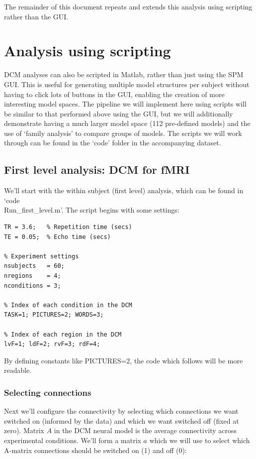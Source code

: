 \documentclass{article}
\begin{document}
The remainder of this document repeats and extends this analysis using scripting rather than the GUI.

\section{Analysis using scripting}

DCM analyses can also be scripted in Matlab, rather than just using the SPM GUI. This is useful for generating multiple model structures per subject without having to click lots of buttons in the GUI, enabling the creation of more interesting model spaces. The pipeline we will implement here using scripts will be similar to that performed above using the GUI, but we will additionally demonstrate having a much larger model space (112 pre-defined models) and the use of `family analysis' to compare groups of models. The scripts we will work through can be found in the `code' folder in the accompanying dataset.

\subsection{First level analysis: DCM for fMRI}

We'll start with the within subject (first level) analysis, which can be found in `code\\Run\_first\_level.m'. The script begins with some settings:

\begin{lstlisting}[style=Matlab-editor,caption=Settings]
% MRI scanner settings
TR = 3.6;   % Repetition time (secs)
TE = 0.05;  % Echo time (secs)

% Experiment settings
nsubjects   = 60;
nregions    = 4; 
nconditions = 3;

% Index of each condition in the DCM
TASK=1; PICTURES=2; WORDS=3;

% Index of each region in the DCM
lvF=1; ldF=2; rvF=3; rdF=4;
\end{lstlisting}

By defining constants like PICTURES=2, the code which follows will be more readable. 

\subsubsection{Selecting connections}

Next we'll configure the connectivity by selecting which connections we want switched on (informed by the data) and which we want switched off (fixed at zero). Matrix \(A\) in the DCM neural model is the average connectivity across experimental conditions. We'll form a matrix  \(a\) which we will use to select which A-matrix connections should be switched on (1) and off (0):
\end{document}
